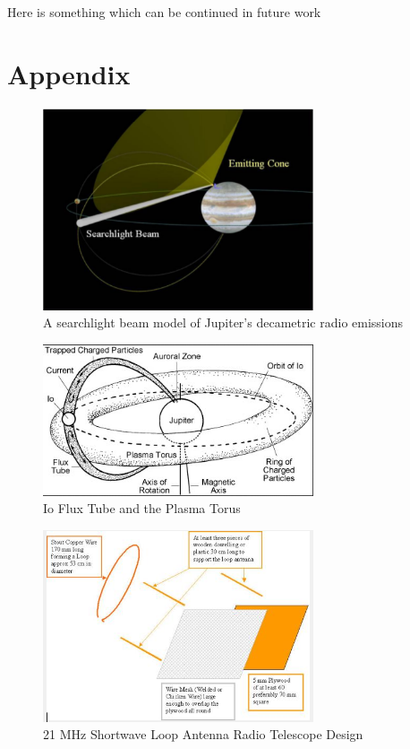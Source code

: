 \documentclass[runningheads,a4paper]{llncs}
\begin{document}
Here is something which can be continued in future work 

%
\appendix
\chapter*{Appendix}

%
\begin{figure}[here]
\centering
\includegraphics[width=8cm]{images/12}
\caption{A searchlight beam model of Jupiter's decametric radio emissions \citep{imai-08}}
\label{fig:decametric_emissions_searchlight}
\end{figure}
%

%
\begin{figure}[here]
\centering
\includegraphics[width=8cm]{images/13}
\caption{Io Flux Tube and the Plasma Torus \citep{lang-10}}
\label{fig:io_flux_tube_plasma_torus}
\end{figure}
%

%
\begin{figure}[here]
\centering
\includegraphics[width=8cm]{images/14}
\caption{21 MHz Shortwave Loop Antenna Radio Telescope Design \citep{greef-12}}
\label{fig:loop_antenna_design_a}
\end{figure}
%
\end{document}
